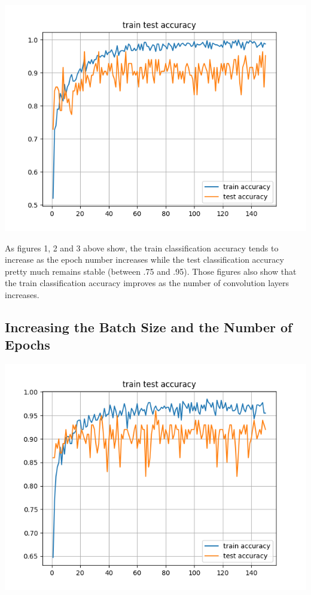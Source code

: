 \documentclass[12pt]{article}
\begin{document}
			\includegraphics[width=\linewidth - 2cm]{accuracy_4_hidden_layers.png}
			
			As figures 1, 2 and 3 above show, the train classification accuracy tends to increase as the epoch number increases while the test classification accuracy pretty much remains stable (between .75 and .95). Those figures also show that the train classification accuracy improves as the number of convolution layers increases.
			
		\subsection{Increasing the Batch Size and the Number of Epochs}
			
			\includegraphics[width=\linewidth - 2cm]{accuracy_2_hl_10.png}
			
\end{document}

